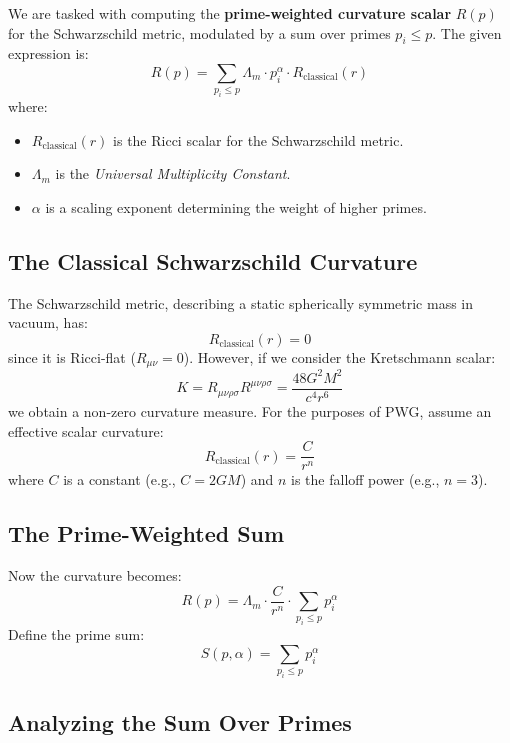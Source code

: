 \documentclass[12pt]{article}
\theoremstyle{plain}
\begin{document}
We are tasked with computing the \textbf{prime-weighted curvature scalar} \( R(p) \) for the Schwarzschild metric, modulated by a sum over primes \( p_i \leq p \). The given expression is:
\[
R(p) = \sum_{p_i \leq p} \Lambda_m \cdot p_i^\alpha \cdot R_{\text{classical}}(r)
\]
where:
\begin{itemize}
    \item \( R_{\text{classical}}(r) \) is the Ricci scalar for the Schwarzschild metric.
    \item \( \Lambda_m \) is the \textit{Universal Multiplicity Constant}.
    \item \( \alpha \) is a scaling exponent determining the weight of higher primes.
\end{itemize}

\subsection{The Classical Schwarzschild Curvature}

The Schwarzschild metric, describing a static spherically symmetric mass in vacuum, has:
\[
R_{\text{classical}}(r) = 0
\]
since it is Ricci-flat (\( R_{\mu\nu} = 0 \)). However, if we consider the Kretschmann scalar:
\[
K = R_{\mu\nu\rho\sigma} R^{\mu\nu\rho\sigma} = \frac{48 G^2 M^2}{c^4 r^6}
\]
we obtain a non-zero curvature measure. For the purposes of PWG, assume an effective scalar curvature:
\[
R_{\text{classical}}(r) = \frac{C}{r^n}
\]
where \( C \) is a constant (e.g., \( C = 2GM \)) and \( n \) is the falloff power (e.g., \( n = 3 \)).

\subsection{The Prime-Weighted Sum}

Now the curvature becomes:
\[
R(p) = \Lambda_m \cdot \frac{C}{r^n} \cdot \sum_{p_i \leq p} p_i^\alpha
\]
Define the prime sum:
\[
S(p, \alpha) = \sum_{p_i \leq p} p_i^\alpha
\]

\subsection{Analyzing the Sum Over Primes}
\end{document}
